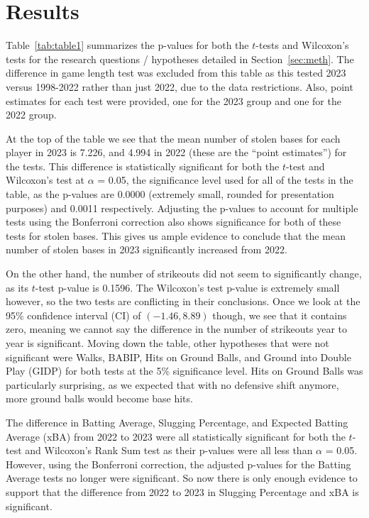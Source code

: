 \documentclass[12pt]{article}
\begin{document}
\section{Results}
\label{sec:resu}

Table~\ref{tab:table1} summarizes the p-values for both the \(t\)-tests and Wilcoxon's
tests for the research questions / hypotheses detailed in Section~\ref{sec:meth}.
The difference in game length test was excluded from this table as this tested
2023 versus 1998-2022 rather than just 2022, due to the data restrictions. Also,
point estimates for each test were provided, one for the 2023 group and one for the
2022 group.

At the top of the table we see that the mean number of stolen bases for each player
in 2023 is 7.226, and 4.994 in 2022 (these are the ``point estimates'') for the tests.
This difference is statistically significant for both the \(t\)-test and Wilcoxon's test
at $\alpha$ = 0.05, the significance level used for all of the tests in the table,
as the p-values are 0.0000 (extremely small, rounded for presentation purposes) and
0.0011 respectively. Adjusting the p-values to account for multiple tests using the
Bonferroni correction also shows significance for both of these tests for stolen bases.
This gives us ample evidence to conclude that the mean number of stolen bases in 2023
significantly increased from 2022.

On the other hand, the number of strikeouts did not seem to significantly change,
as its \(t\)-test p-value is 0.1596. The Wilcoxon's test p-value is extremely small
however, so the two tests are conflicting in their conclusions. Once we look at the
95\% confidence interval (CI) of \((-1.46, 8.89)\) though, we see that it contains zero,
meaning we cannot say the difference in the number of strikeouts year to year is significant.
Moving down the table, other hypotheses that were not significant were Walks, BABIP,
Hits on Ground Balls, and Ground into Double Play (GIDP) for both tests at the
5\% significance level. Hits on Ground Balls was particularly surprising, as
we expected that with no defensive shift anymore, more ground balls would become
base hits.

The difference in Batting Average, Slugging Percentage, and Expected Batting Average (xBA)
from 2022 to 2023 were all statistically significant for both the \(t\)-test and
Wilcoxon's Rank Sum test as their p-values were all less than $\alpha$ = 0.05. However,
using the Bonferroni correction, the adjusted p-values for the Batting Average
tests no longer were significant. So now there is only enough evidence to support
that the difference from 2022 to 2023 in Slugging Percentage and xBA is significant.
\end{document}
